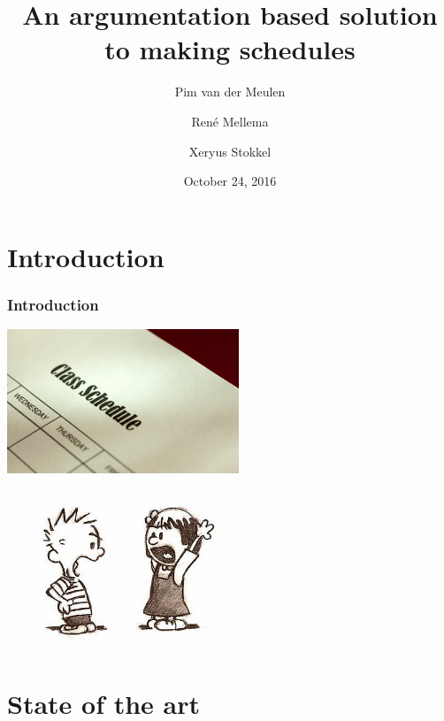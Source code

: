 \documentclass{beamer}
\title{An argumentation based solution to making schedules}
\author{Pim van der Meulen \and Ren\'e Mellema \and Xeryus Stokkel}
\date{October 24, 2016}
\begin{document}
\frame{\titlepage}

\section{Introduction}
\begin{frame}
	\frametitle{Introduction}
	\includegraphics[width=0.52\textwidth]{Schedule.jpg}%
	\includegraphics[width=0.48\textwidth]{Argument.jpg}
\end{frame}

\section{State of the art}
\end{document}
